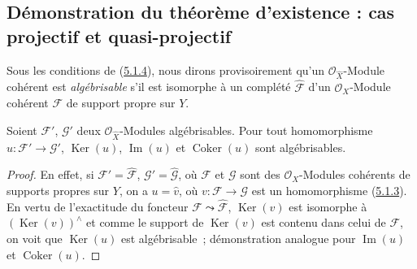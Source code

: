 \subsection{Démonstration du théorème d'existence : cas projectif et quasi-projectif}
\label{subsection:III.5.2-fr}

\begin{env}[5.2.1]
\label{III.5.2.1-fr}
Sous les conditions de (\hyperref[III.5.1.4-fr]{5.1.4}), nous dirons provisoirement
qu'un $\mathcal O_{\widehat X}$-Module cohérent est \emph{algébrisable} s'il est isomorphe
à un complété $\widehat{\mathcal F}$ d'un $\mathcal O_X$-Module cohérent
$\mathcal F$ de support propre sur $Y$.
\end{env}

\begin{lemma}[5.2.2]
\label{III.5.2.2-fr}
Soient $\mathcal F'$, $\mathcal G'$ deux $\mathcal O_{\widehat X}$-Modules
algébrisables. Pour tout homomorphisme $u:\mathcal F'\to\mathcal G'$,
$\operatorname{Ker}(u)$, $\operatorname{Im}(u)$ et $\operatorname{Coker}(u)$ sont
algébrisables.
\end{lemma}

\begin{proof}
En effet, si $\mathcal F'=\widehat{\mathcal F}$,
$\mathcal G'=\widehat{\mathcal G}$, où $\mathcal F$ et $\mathcal G$ sont des
$\mathcal O_X$-Modules cohérents de supports propres sur $Y$, on a
$u=\widehat v$, où $v:\mathcal F\to\mathcal G$ est un homomorphisme
(\hyperref[III.5.1.3-fr]{5.1.3}). En vertu de l'exactitude du foncteur
$\mathcal F\leadsto\widehat{\mathcal F}$,
$\operatorname{Ker}(\widehat v)$ est isomorphe à
$(\operatorname{Ker}(v))^{\wedge}$ et comme le support de
$\operatorname{Ker}(v)$ est contenu dans celui de $\mathcal F$, on voit que
$\operatorname{Ker}(u)$ est algébrisable~; démonstration analogue pour
$\operatorname{Im}(u)$ et $\operatorname{Coker}(u)$.
\end{proof}

